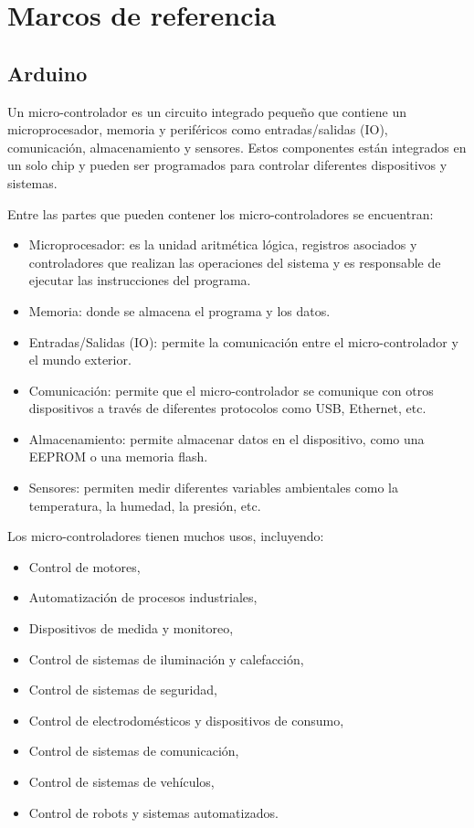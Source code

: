 \chapter{Marcos de referencia}
\section{Arduino}

Un micro-controlador es un circuito integrado pequeño que contiene un microprocesador, memoria y periféricos como entradas/salidas (IO), comunicación, almacenamiento y sensores. Estos componentes están integrados en un solo chip y pueden ser programados para controlar diferentes dispositivos y sistemas.

Entre las partes que pueden contener los micro-controladores se encuentran: 

\begin{itemize}
    \item Microprocesador: es la unidad aritmética lógica,  registros asociados y controladores  que realizan  las operaciones del sistema y es responsable de ejecutar las instrucciones del programa.
    \item Memoria: donde se almacena el programa y los datos.
    \item Entradas/Salidas (IO): permite la comunicación entre el micro-controlador y el mundo exterior.
    \item Comunicación: permite que el micro-controlador se comunique con otros dispositivos a través de diferentes protocolos como USB, Ethernet, etc.
    \item Almacenamiento: permite almacenar datos en el dispositivo, como una EEPROM o una memoria flash.
    \item Sensores: permiten medir diferentes variables ambientales como la temperatura, la humedad, la presión, etc.
\end{itemize}

Los micro-controladores tienen muchos usos, incluyendo: 
\begin{itemize}
    \item Control de motores,
    \item Automatización de procesos industriales,
    \item Dispositivos de medida y monitoreo,
    \item Control de sistemas de iluminación y calefacción,
    \item Control de sistemas de seguridad,
    \item Control de electrodomésticos y dispositivos de consumo,
    \item Control de sistemas de comunicación,
    \item Control de sistemas de vehículos,
    \item Control de robots y sistemas automatizados.
\end{itemize}

